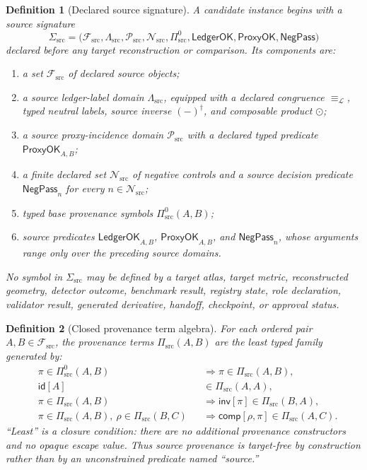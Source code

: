 \documentclass[11pt]{article}
\newtheorem{definition}{Definition}
\newcommand{\PiSrc}{\Pi_{\mathrm{src}}}
\begin{document}
\begin{definition}[Declared source signature]
A candidate instance begins with a source signature
\[
 \Sigma_{\mathrm{src}}
 =
 \bigl(
 \mathcal F_{\mathrm{src}},
 \Lambda_{\mathrm{src}},
 \mathcal P_{\mathrm{src}},
 \mathcal N_{\mathrm{src}},
 \Pi^{0}_{\mathrm{src}},
 \mathsf{LedgerOK},
 \mathsf{ProxyOK},
 \mathsf{NegPass}
 \bigr)
\]
declared before any target reconstruction or comparison. Its components are:
\begin{enumerate}[leftmargin=*]
  \item a set \(\mathcal F_{\mathrm{src}}\) of declared source objects;
  \item a source ledger-label domain \(\Lambda_{\mathrm{src}}\), equipped with
  a declared congruence \(\equiv_{\mathcal L}\), typed neutral labels,
  source inverse \((-)^\dagger\), and composable product \(\odot\);
  \item a source proxy-incidence domain \(\mathcal P_{\mathrm{src}}\) with a
  declared typed predicate \(\mathsf{ProxyOK}_{A,B}\);
  \item a finite declared set \(\mathcal N_{\mathrm{src}}\) of negative
  controls and a source decision predicate
  \(\mathsf{NegPass}_{n}\) for every \(n\in\mathcal N_{\mathrm{src}}\);
  \item typed base provenance symbols
  \(\Pi^{0}_{\mathrm{src}}(A,B)\);
  \item source predicates \(\mathsf{LedgerOK}_{A,B}\),
  \(\mathsf{ProxyOK}_{A,B}\), and \(\mathsf{NegPass}_{n}\), whose arguments
  range only over the preceding source domains.
\end{enumerate}
No symbol in \(\Sigma_{\mathrm{src}}\) may be defined by a target atlas, target
metric, reconstructed geometry, detector outcome, benchmark result, registry
state, role declaration, validator result, generated derivative, handoff,
checkpoint, or approval status.
\end{definition}

\begin{definition}[Closed provenance term algebra]
For each ordered pair \(A,B\in\mathcal F_{\mathrm{src}}\), the provenance
terms \(\PiSrc(A,B)\) are the least typed family generated by:
\[
\begin{aligned}
 &\pi\in\Pi^{0}_{\mathrm{src}}(A,B)
   &&\Longrightarrow \pi\in\PiSrc(A,B),\\
 &\mathsf{id}[A] &&\in\PiSrc(A,A),\\
 &\pi\in\PiSrc(A,B)
   &&\Longrightarrow \mathsf{inv}[\pi]\in\PiSrc(B,A),\\
 &\pi\in\PiSrc(A,B),\ \rho\in\PiSrc(B,C)
   &&\Longrightarrow \mathsf{comp}[\rho,\pi]\in\PiSrc(A,C).
\end{aligned}
\]
``Least'' is a closure condition: there are no additional provenance
constructors and no opaque escape value. Thus source provenance is target-free
by construction rather than by an unconstrained predicate named ``source.''
\end{definition}
\end{document}

